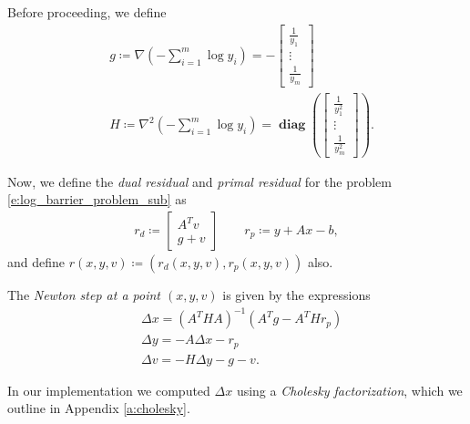 \documentclass[11pt]{amsart}
\theoremstyle{definition}
\theoremstyle{remark}
\newcommand{\transpose}{T}
\DeclareMathOperator{\diag}{\textbf{diag}}
\begin{document}
    Before proceeding, we define 
    \begin{align*}
        &g \coloneqq \nabla \left( -\sum_{i=1}^m \log{y_i} \right) = 
        - \begin{bmatrix}
            \frac{1}{y_1} \\
            \vdots \\
            \frac{1}{y_m}
        \end{bmatrix} \\
        &H \coloneqq \nabla^2 \left( -\sum_{i=1}^m \log{y_i} \right) = \diag\left(\begin{bmatrix}
            \frac{1}{y_1^2} \\
            \vdots \\
            \frac{1}{y_m^2}
        \end{bmatrix} \right). 
    \end{align*} 

    Now, we define the \emph{dual residual} and \emph{primal residual} for the problem \eqref{e:log_barrier_problem_sub} as
    \begin{align*}
        r_d \coloneqq
        \begin{bmatrix}
            A^\transpose v \\
            g + v
        \end{bmatrix} \quad\quad r_p \coloneqq y + Ax - b, 
    \end{align*}
    and define $r(x, y, v) \coloneqq (r_d(x, y, v), r_p(x, y, v))$ also.

    The \emph{Newton step at a point $(x, y, v)$} is given by the expressions
    \begin{align*}
        &\Delta x = (A^\transpose HA)^{-1}(A^\transpose g - A^\transpose Hr_p)\\
        &\Delta y = - A\Delta x - r_p \\
        &\Delta v = - H\Delta y - g - v.
    \end{align*}

    In our implementation we computed $\Delta x$ using a \emph{Cholesky factorization}, which we outline in Appendix \ref{a:cholesky}. 
\end{document}

